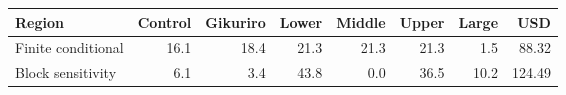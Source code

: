 \begin{tabular}{lrrrrrrr}
\toprule
Region & Control & Gikuriro & Lower & Middle & Upper & Large & USD \\
\midrule
Finite conditional & 16.1 & 18.4 & 21.3 & 21.3 & 21.3 & 1.5 & 88.32 \\
Block sensitivity & 6.1 & 3.4 & 43.8 & 0.0 & 36.5 & 10.2 & 124.49 \\
\bottomrule
\end{tabular}
